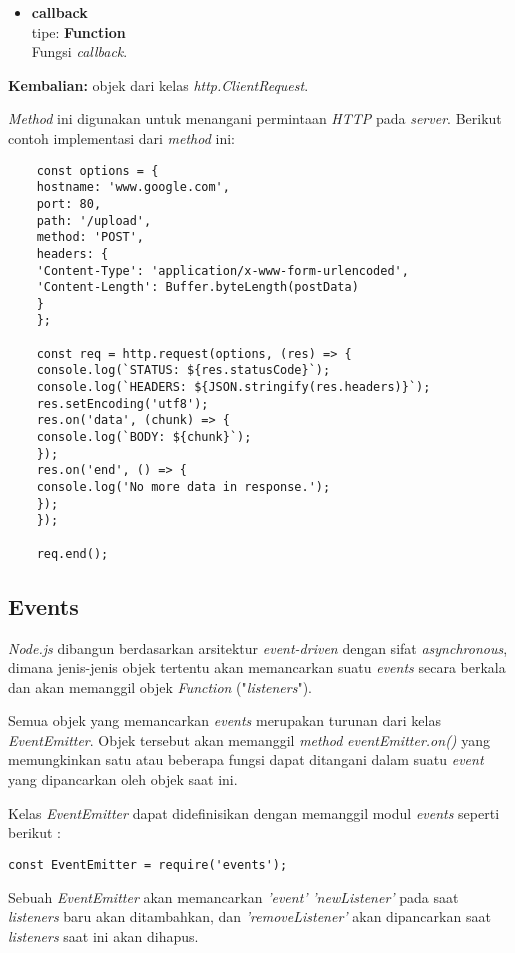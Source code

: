 \begin{itemize}
\begin{itemize}
		\item \textbf{callback} \\tipe: \textbf{Function} \\ Fungsi \textit{callback}.
	\end{itemize}
	
	\textbf{Kembalian:} objek dari kelas \textit{http.ClientRequest}.
	
	\textit{Method} ini digunakan untuk menangani permintaan \textit{HTTP} pada \textit{server}. Berikut contoh implementasi dari \textit{method} ini:
	\begin{lstlisting}
	const options = {
	hostname: 'www.google.com',
	port: 80,
	path: '/upload',
	method: 'POST',
	headers: {
	'Content-Type': 'application/x-www-form-urlencoded',
	'Content-Length': Buffer.byteLength(postData)
	}
	};
	
	const req = http.request(options, (res) => {
	console.log(`STATUS: ${res.statusCode}`);
	console.log(`HEADERS: ${JSON.stringify(res.headers)}`);
	res.setEncoding('utf8');
	res.on('data', (chunk) => {
	console.log(`BODY: ${chunk}`);
	});
	res.on('end', () => {
	console.log('No more data in response.');
	});
	});
	
	req.end();
	\end{lstlisting}
	
\end{itemize}

\subsection{Events}
\textit{Node.js} dibangun berdasarkan arsitektur \textit{event-driven} dengan sifat \textit{asynchronous}, dimana jenis-jenis objek tertentu akan memancarkan suatu \textit{events} secara berkala dan akan memanggil objek \textit{Function} ("\textit{listeners}").

Semua objek yang memancarkan \textit{events} merupakan turunan dari kelas \textit{EventEmitter}. Objek tersebut akan memanggil \textit{method} \textit{eventEmitter.on()} yang memungkinkan satu atau beberapa fungsi dapat ditangani dalam suatu \textit{event} yang dipancarkan oleh objek saat ini.

Kelas \textit{EventEmitter} dapat didefinisikan dengan memanggil modul \textit{events} seperti berikut :

\begin{lstlisting}
const EventEmitter = require('events');
\end{lstlisting}

Sebuah \textit{EventEmitter} akan memancarkan \textit{'event'} \textit{'newListener'} pada saat \textit{listeners} baru akan ditambahkan, dan \textit{'removeListener'} akan dipancarkan saat \textit{listeners} saat ini akan dihapus.

